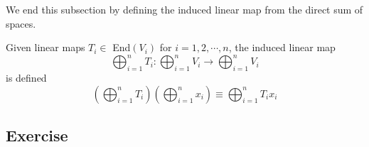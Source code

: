   We end this subsection by defining the induced linear map from the direct sum of spaces. 

  \begin{definition}
    Given linear maps $T_i \in$ End$(V_i)$ for $i = 1, 2, \cdots, n$, the induced linear map
    \begin{equation}
      \bigoplus_{i =1}^n T_i: \bigoplus_{i=1}^n V_i \longrightarrow \bigoplus_{i=1}^n V_i
    \end{equation}
    is defined
    \begin{equation}
      (\bigoplus_{i=1}^n T_i)(\bigoplus_{i=1}^n x_i) \equiv \bigoplus_{i=1}^n T_i x_i
    \end{equation}
  \end{definition}

\subsection{Exercise}
